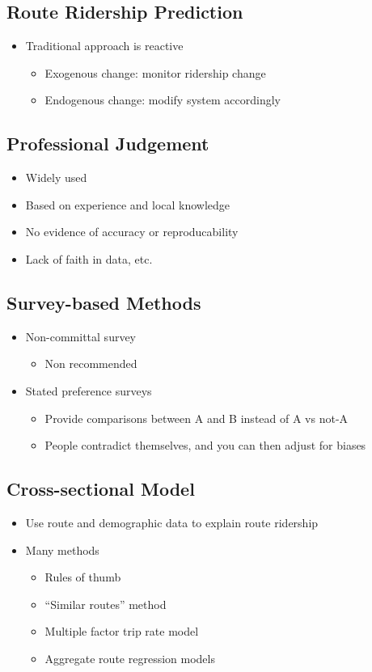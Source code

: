 \documentclass[11pt]{article}
\begin{document}
\subsection{Route Ridership Prediction}
\label{sec:org008ba33}
\begin{itemize}
\item Traditional approach is reactive
\begin{itemize}
\item Exogenous change: monitor ridership change
\item Endogenous change: modify system accordingly
\end{itemize}
\end{itemize}
\subsection{Professional Judgement}
\label{sec:org23a76fe}
\begin{itemize}
\item Widely used
\item Based on experience and local knowledge
\item No evidence of accuracy or reproducability
\item Lack of faith in data, etc.
\end{itemize}
\subsection{Survey-based Methods}
\label{sec:org4b32edb}
\begin{itemize}
\item Non-committal survey
\begin{itemize}
\item Non recommended
\end{itemize}
\item Stated preference surveys
\begin{itemize}
\item Provide comparisons between A and B instead of A vs not-A
\item People contradict themselves, and you can then adjust for biases
\end{itemize}
\end{itemize}
\subsection{Cross-sectional Model}
\label{sec:org9f009c4}
\begin{itemize}
\item Use route and demographic data to explain route ridership
\item Many methods
\begin{itemize}
\item Rules of thumb
\item ``Similar routes'' method
\item Multiple factor trip rate model
\item Aggregate route regression models
\end{itemize}
\end{itemize}
\end{document}
